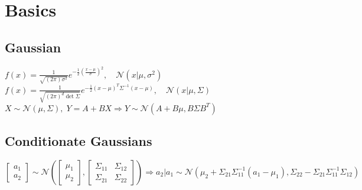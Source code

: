\section{Basics}

\subsection*{Gaussian}
$f(x) = \frac{1}{\sqrt{(2\pi)\sigma^2}} e^{-\frac{1}{2} {\left(\frac{x-\mu}{\sigma}\right)}^2},\quad \mathcal{N}(x|\mu, \sigma^2)$\\
$f(x) = \frac{1}{\sqrt{(2\pi)^d\det\Sigma}} e^{- \frac{1}{2} (x-\mu)^T \Sigma^{-1} (x-\mu)},\quad \mathcal{N}(x|\mu, \Sigma)$\\
$X {\sim} \mathcal{N}(\mu,\Sigma),\;Y{=}A{+}BX \Rightarrow Y{\sim}\mathcal{N}(A{+}B\mu,B\Sigma B^T)$ 
\subsection*{Conditionate Gaussians}
\(
\begin{bmatrix} a_1 \\ a_2 \end{bmatrix} \sim \mathcal{N}\left(\begin{bmatrix}\mu_1 \\ \mu_2\end{bmatrix},\begin{bmatrix} \Sigma_{11}&\Sigma_{12} \\\Sigma_{21}&\Sigma_{22} \end{bmatrix}\right)
\Rightarrow a_2\vert a_1 \sim \mathcal{N}\left(\mu_2 + \Sigma_{21}\Sigma^{-1}_{11}(a_1-\mu_1) , \Sigma_{22}-\Sigma_{21}\Sigma^{-1}_{11}\Sigma_{12}\right)
\)


